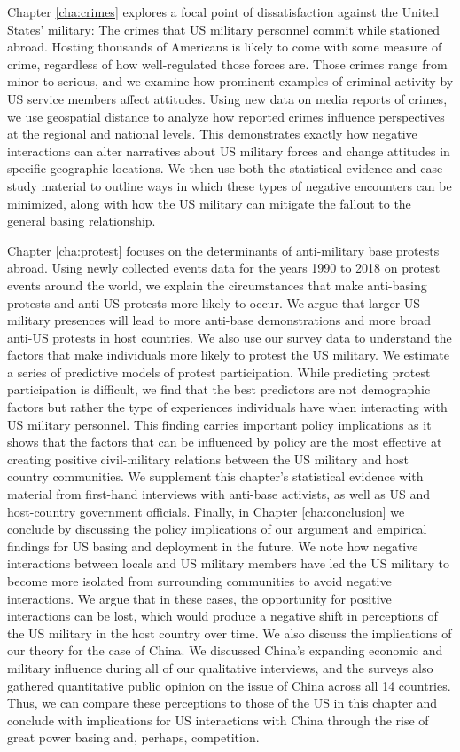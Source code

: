 Chapter \ref{cha:crimes} explores a focal point of dissatisfaction against the United States' military: The crimes that US military personnel commit while stationed abroad. Hosting thousands of Americans is likely to come with some measure of crime, regardless of how well-regulated those forces are. Those crimes range from minor to serious, and we examine how prominent examples of criminal activity by US service members affect attitudes. Using new data on media reports of crimes, we use geospatial distance to analyze how reported crimes influence perspectives at the regional and national levels. This demonstrates exactly how negative interactions can alter narratives about US military forces and change attitudes in specific geographic locations. We then use both the statistical evidence and case study material to outline ways in which these types of negative encounters can be minimized, along with how the US military can mitigate the fallout to the general basing relationship. 

Chapter \ref{cha:protest} focuses on the determinants of anti-military base protests abroad. Using newly collected events data for the years 1990 to 2018 on protest events around the world, we explain the circumstances that make anti-basing protests and anti-US protests more likely to occur. We argue that larger US military presences will lead to more anti-base demonstrations and more broad anti-US protests in host countries. We also use our survey data to understand the factors that make individuals more likely to protest the US military. We estimate a series of predictive models of protest participation. While predicting protest participation is difficult, we find that the best predictors are not demographic factors but rather the type of experiences individuals have when interacting with US military personnel. This finding carries important policy implications as it shows that the factors that can be influenced by policy are the most effective at creating positive civil-military relations between the US military and host country communities. We supplement this chapter's statistical evidence with material from first-hand interviews with anti-base activists, as well as US and host-country government officials. 
Finally, in Chapter \ref{cha:conclusion} we conclude by discussing the policy implications of our argument and empirical findings for US basing and deployment in the future. We note how negative interactions between locals and US military members have led the US military to become more isolated from surrounding communities to avoid negative interactions. We argue that in these cases, the opportunity for positive interactions can be lost, which would produce a negative shift in perceptions of the US military in the host country over time. We also discuss the implications of our theory for the case of China. We discussed China's expanding economic and military influence during all of our qualitative interviews, and the surveys also gathered quantitative public opinion on the issue of China across all 14 countries. Thus, we can compare these perceptions to those of the US in this chapter and conclude with implications for US interactions with China through the rise of great power basing and, perhaps, competition.
